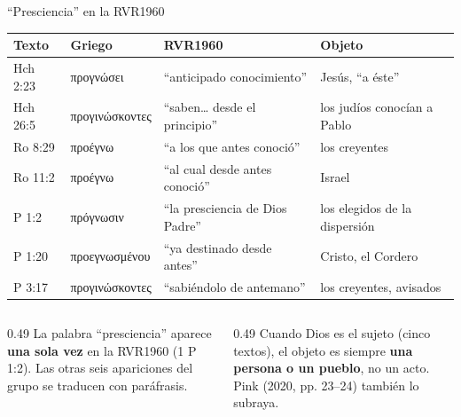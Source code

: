 \documentclass[hyperref={bookmarks=false},aspectratio=169]{beamer}
\newcommand{\grc}[1]{\foreignlanguage{ancientgreek}{#1}}
\newcommand{\destacar}[1]{\textbf{\textcolor{azul}{#1}}}
\begin{document}
\begin{frame}{``Presciencia'' en la RVR1960}
\scriptsize\renewcommand{\arraystretch}{1.18}
\begin{tabular}{@{}>{\RaggedRight\arraybackslash}p{1.6cm}>{\RaggedRight\arraybackslash}p{2.4cm}>{\RaggedRight\arraybackslash}p{3.8cm}>{\RaggedRight\arraybackslash}p{3.8cm}@{}}
\toprule
\textbf{Texto} & \textbf{Griego} & \textbf{RVR1960} & \textbf{Objeto} \\ \midrule
Hch 2:23 & \grc{προγνώσει} & ``anticipado conocimiento'' & Jesús, ``a éste'' \\
Hch 26:5 & \grc{προγινώσκοντες} & ``saben\ldots{} desde el principio'' & los judíos conocían a Pablo \\
Ro 8:29 & \grc{προέγνω} & ``a los que antes conoció'' & los creyentes \\
Ro 11:2 & \grc{προέγνω} & ``al cual desde antes conoció'' & Israel \\
1 P 1:2 & \grc{πρόγνωσιν} & ``la presciencia de Dios Padre'' & los elegidos de la dispersión \\
1 P 1:20 & \grc{προεγνωσμένου} & ``ya destinado desde antes'' & Cristo, el Cordero \\
2 P 3:17 & \grc{προγινώσκοντες} & ``sabiéndolo de antemano'' & los creyentes, avisados \\
\bottomrule
\end{tabular}\par\medskip
\begin{columns}[t,onlytextwidth]
\begin{column}{0.49\textwidth}\small
La palabra ``presciencia'' aparece \destacar{una sola vez} en la RVR1960 (1 P 1:2). Las otras seis apariciones del grupo se traducen con paráfrasis.
\end{column}
\begin{column}{0.49\textwidth}\scriptsize
Cuando Dios es el sujeto (cinco textos), el objeto es siempre \destacar{una persona o un pueblo}, no un acto. Pink (2020, pp. 23--24) también lo subraya.
\end{column}
\end{columns}
\end{frame}
\end{document}
